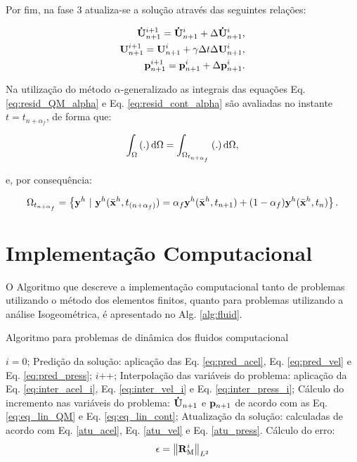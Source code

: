 \documentclass[tese_patricia]{subfiles}%
\begin{document}
Por fim, na fase 3 atualiza-se a solução através das seguintes relações:

\begin{align}
\mathbf{\dot{U}}_{n+1}^{i+1} = \mathbf{\dot{U}}_{n+1}^{i} + \Delta\mathbf{\dot{U}}_{n+1}^{i},\label{atu_acel} \\ 
\mathbf{U}_{n+1}^{i+1} = \mathbf{U}_{n+1}^{i} + \gamma \Delta t \Delta\mathbf{U}_{n+1}^{i},\label{atu_vel}\\
\mathbf{p}_{n+1}^{i+1} = \mathbf{p}_{n+1}^{i} + \Delta\mathbf{p}_{n+1}^{i}.\label{atu_press}
\end{align}

Na utilização do método $\alpha$-generalizado as integrais das equações Eq. \eqref{eq:resid_QM_alpha} e Eq. \eqref{eq:resid_cont_alpha} são avaliadas no instante $t = t_{n+\alpha_{f}}$, de forma que:

\begin{align}
\int_{\Omega} \left(.\right) \mathrm{d} \Omega = \int_{\Omega_{t_{n+\alpha_{f}}}} \left(.\right) \mathrm{d} \Omega,
\end{align}

\noindent e, por consequência:

\begin{align}
\Omega_{t_{n+\alpha_{f}}} = \left\{\mathbf{y}^h \  |\  \mathbf{y}^h(\bar{\mathbf{x}}^h,t_{(n+\alpha_f)}) = \alpha_f \mathbf{y}^h(\bar{\mathbf{x}}^h,t_{n+1}) + (1-\alpha_f) \mathbf{y}^h(\bar{\mathbf{x}}^h,t_n)  \right\}.
\end{align}


\section{Implementação Computacional} \label{capitulo:Cap2:DFCComputationalCode}


O Algoritmo que descreve a implementação computacional tanto de problemas utilizando o método dos elementos finitos, quanto para problemas utilizando a análise Isogeométrica, é apresentado no Alg. \ref{alg:fluid}.

\begin{algorithm}
	\caption{Algoritmo para problemas de dinâmica dos fluidos computacional}
	\label{alg:fluid}
	\begin{algorithmic}[1]
		\State $i=0$;
		\State Predição da solução: aplicação das Eq. \eqref{eq:pred_acel}, Eq. \eqref{eq:pred_vel} e Eq. \eqref{eq:pred_press};
		\State $i$++;
		\State Interpolação das variáveis do problema: aplicação da Eq. \eqref{eq:inter_acel_i}, Eq. \eqref {eq:inter_vel_i} e Eq. \eqref{eq:inter_press_i};
		\State Cálculo do incremento nas variáveis do problema: $\mathbf{\dot{U}}_{n+1}$ e $\mathbf{p}_{n+1}$ de acordo com as Eq. \eqref{eq:eq_lin_QM} e Eq. \eqref{eq:eq_lin_cont};
		\State Atualização da solução: calculadas de acordo com Eq. \eqref{atu_acel}, Eq. \eqref{atu_vel} e Eq. \eqref{atu_press}.
		\State Cálculo do erro:
		\begin{align}
		\epsilon =\left\| \mathbf{R}_\mathrm{M}^i \right\|_{L^2}
		\end{align}
		\EndWhile
		\EndFor
	\end{algorithmic}
\end{algorithm}
\end{document}
